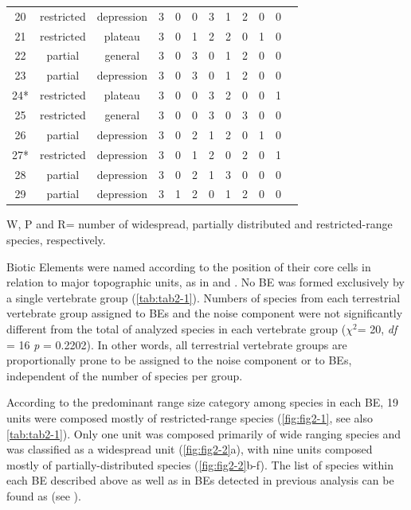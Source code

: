 \documentclass[12pt,openright,oneside,a4paper,english]{abntex2}
\begin{document}
\begin{table}
\begin{tabular}{c c c c c c c c c c c c}
		20 & restricted & depression & 3 & 0 & 0 & 3 & 1 & 2 & 0 & 0\\
		21 & restricted & plateau & 3 & 0 & 1 & 2 & 2 & 0 & 1 & 0\\
		22 & partial & general & 3 & 0 & 3 & 0 & 1 & 2 & 0 & 0\\
		23 & partial & depression & 3 & 0 & 3 & 0 & 1 & 2 & 0 & 0\\
		24* & restricted & plateau & 3 & 0 & 0 & 3 & 2 & 0 & 0 & 1\\
		25 & restricted & general & 3 & 0 & 0 & 3 & 0 & 3 & 0 & 0\\
		26 & partial & depression & 3 & 0 & 2 & 1 & 2 & 0 & 1 & 0\\
		27* & restricted & depression & 3 & 0 & 1 & 2 & 0 & 2 & 0 & 1\\
		28 & partial & depression & 3 & 0 & 2 & 1 & 3 & 0 & 0 & 0\\
		29 & partial & depression & 3 & 1 & 2 & 0 & 1 & 2 & 0 & 0\\
		\hline
	\end{tabular}

W, P and R= number of widespread, partially distributed and restricted-range species, respectively.
\end{table}
Biotic Elements were named according to the position of their core cells in relation to major topographic units, as in \citet{Nogueira2011} and \citet{Azevedo2016}. No BE was formed exclusively by a single vertebrate group (\autoref{tab:tab2-1}). Numbers of species from each terrestrial vertebrate group assigned to BEs and the noise component were not significantly different from the total of analyzed species in each vertebrate group ($\chi^2$= 20, \textit{df} = 16 \textit{p} = 0.2202). In other words, all terrestrial vertebrate groups are proportionally prone to be assigned to the noise component or to BEs, independent of the number of species per group. 

According to the predominant range size category among species in each BE, 19 units were composed mostly of restricted-range species (\autoref{fig:fig2-1}, see also \autoref{tab:tab2-1}). Only one unit was composed primarily of wide ranging species and was classified as a widespread unit (\autoref{fig:fig2-2}a), with nine units composed mostly of partially-distributed species (\autoref{fig:fig2-2}b-f). The list of species within each BE described above as well as in BEs detected in previous analysis can be found as  (see ).
\end{document}
